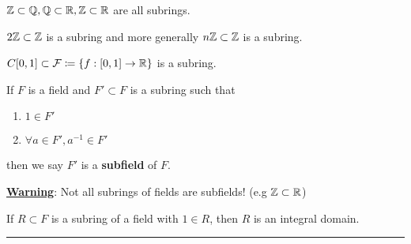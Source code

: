 \documentclass[../Main.tex]{subfiles}
\begin{document}
\begin{example}
	$\mathbb{Z} \subset \mathbb{Q}, \mathbb{Q} \subset \mathbb{R}, \mathbb{Z} \subset \mathbb{R}$ are all subrings.
\end{example}
\begin{example}
	$2\mathbb{Z} \subset \mathbb{Z}$ is a subring and more generally $n\mathbb{Z} \subset \mathbb{Z}$ is a subring.
\end{example}
\begin{example}
	$C[0,1] \subset \mathcal{F} \coloneqq \{f: [0,1]\to \mathbb{R}\}$ is a subring.
\end{example}
\begin{dfn}[title=Subfield]
	If $F$ is a field and $F' \subset F$ is a subring such that
	\begin{enumerate}
		\item $1 \in F'$
		\item $\forall a \in F', a^{-1} \in F'$
	\end{enumerate}
	then we say $F'$ is a \textbf{subfield} of $F$.
\end{dfn}
\textbf{\textcolor{BrickRed}{\underline{Warning}}}: Not all subrings of fields are subfields! (e.g $\mathbb{Z}\subset \mathbb{R}$)
\begin{claim}
	If $R \subset F$ is a subring of a field with $1\in R$, then $R$ is an integral domain.
\end{claim}
\noindent\rule{\textwidth}{1pt}
\end{document}
